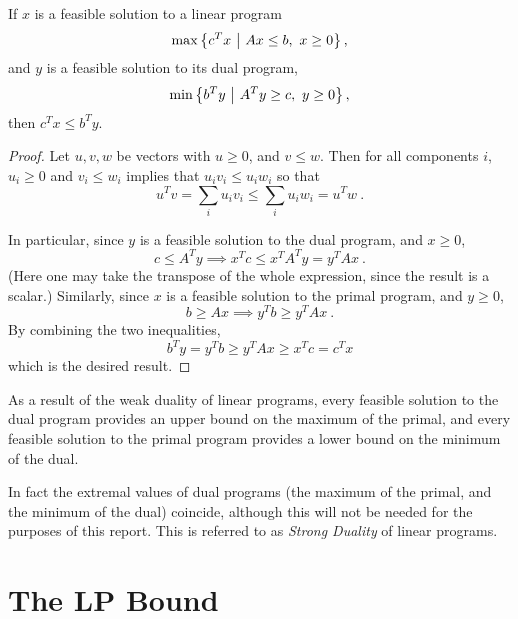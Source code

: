 \documentclass{report}
\begin{document}
      \begin{thm}\label{weak-duality}
        If $x$ is a feasible solution to a linear program
        $$
          \max\left\lbrace  
            c^T x
           \ \middle| \ 
            A x \leq b,\
            x \geq 0
            \right\rbrace,
        $$
        and $y$ is a feasible solution to its dual program,
        $$
          \min\left\lbrace  
            b^T y
           \ \middle| \ 
            A^T y \geq c,\
            y \geq 0
            \right\rbrace,
        $$
        then $c^T x \leq b^T y$.
      \end{thm}

      \begin{proof}
        Let $u, v, w$ be vectors with $u \geq 0$, and $v \leq w$.
        Then for all components $i$,
        $u_i \geq 0$ and $v_i \leq w_i$ implies that $u_i v_i \leq u_i w_i$
        so that
        $$
          u^T v = \sum_i u_i v_i
          \leq \sum_i u_i w_i = u^T w
          \ .
        $$

        In particular, since $y$ is a feasible solution to the dual program,
        and $x \geq 0$,
        $$
          c \leq A^T y 
          \implies x^T c \leq x^T A^T y = y^T A x
          \ .
        $$
        (Here one may take the transpose of the whole expression,
        since the result is a scalar.)
        Similarly, since $x$ is a feasible solution to the primal program,
        and $y \geq 0$,
        $$
          b \geq A x 
          \implies y^T b \geq y^T A x
          \ .
        $$
        By combining the two inequalities,
        $$
          b^T y = y^T b \geq y^T A x \geq x^T c = c^T x
        $$
        which is the desired result.
      \end{proof}

      As a result of the weak duality of linear programs,
      every feasible solution to the dual program
      provides an upper bound on the maximum of the primal,
      and every feasible solution to the primal program
      provides a lower bound on the minimum of the dual.

      In fact the extremal values of dual programs
      (the maximum of the primal, and the minimum of the dual)
      coincide, although this will not be needed for the purposes of this
      report.
      This is referred to as \textit{Strong Duality} of linear programs.

  \section{The LP Bound}
\end{document}

